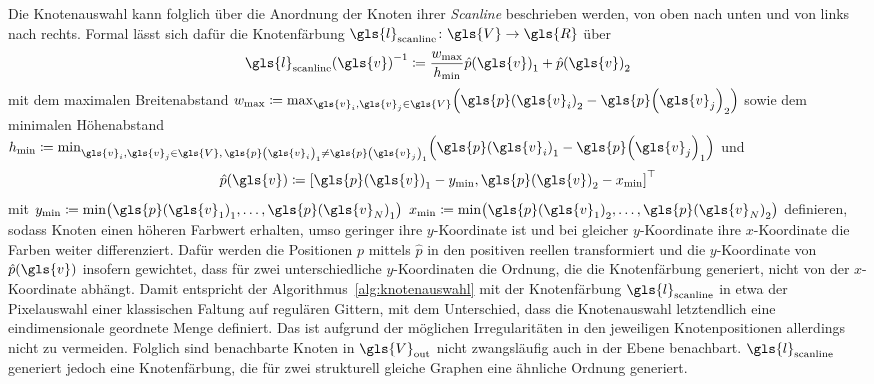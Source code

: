 Die Knotenauswahl kann folglich über die Anordnung der Knoten \bzgl{} ihrer \emph{Scanline} beschrieben werden, \dhe{} von oben nach unten und von links nach rechts.
Formal lässt sich dafür die Knotenfärbung $\gls{l}_{\mathrm{scanline}} \colon \gls{V} \to \gls{R}$ über
\begin{equation*}
  {\gls{l}_{\mathrm{scanline}}\left(\gls{v}\right)}^{-1} \coloneqq \frac{w_{\max}}{h_{\min}} {\hat p\left(\gls{v}\right)}_1 + {\hat p\left(\gls{v}\right)}_2
\end{equation*}
mit dem maximalen Breitenabstand $w_{\max} \coloneqq \max_{\gls{v}_i, \gls{v}_j \in \gls{V}} \left({\gls{p}\left(\gls{v}_i\right)}_2 - {\gls{p}\left(\gls{v}_j\right)}_2 \right)$ sowie dem minimalen Höhenabstand $h_{\min} \coloneqq \min_{\gls{v}_i, \gls{v}_j \in \gls{V},\, {\gls{p}\left(\gls{v}_i\right)}_1 \neq {\gls{p}\left(\gls{v}_j\right)}_1} \left({\gls{p}\left(\gls{v}_i\right)}_1 - {\gls{p}\left(\gls{v}_j\right)}_1 \right)$ und
\begin{equation*}
  \hat p\left(\gls{v}\right) \coloneqq {\left[{\gls{p}\left(\gls{v}\right)}_1 - y_{\min}, {\gls{p}\left(\gls{v}\right)}_2 - x_{\min}\right]}^{\top}
\end{equation*}
mit $y_{\min} \coloneqq \min \left({\gls{p}\left(\gls{v}_1\right)}_1, \ldots, {\gls{p}\left(\gls{v}_N\right)}_1\right)$ \bzw{} $x_{\min} \coloneqq \min \left({\gls{p}\left(\gls{v}_1\right)}_2, \ldots, {\gls{p}\left(\gls{v}_N\right)}_2\right)$ definieren, sodass Knoten einen höheren Farbwert erhalten, umso geringer ihre $y$-Koordinate ist und bei gleicher $y$-Koordinate ihre $x$-Koordinate die Farben weiter differenziert.
Dafür werden die Positionen $p$ mittels $\hat p$ in den positiven reellen transformiert und die $y$-Koordinate von $\hat p\left(\gls{v}\right)$ insofern gewichtet, dass für zwei unterschiedliche $y$-Koordinaten die Ordnung, die die Knotenfärbung generiert, nicht von der $x$-Koordinate abhängt.
Damit entspricht der Algorithmus~\ref{alg:knotenauswahl} mit der Knotenfärbung $\gls{l}_{\mathrm{scanline}}$ in etwa der Pixelauswahl einer klassischen Faltung auf regulären Gittern, mit dem Unterschied, dass die Knotenauswahl letztendlich eine eindimensionale geordnete Menge definiert.
Das ist aufgrund der möglichen Irregularitäten in den jeweiligen Knotenpositionen allerdings nicht zu vermeiden.
Folglich sind benachbarte Knoten in $\gls{V}_{\mathrm{out}}$ nicht zwangsläufig auch in der Ebene benachbart.
$\gls{l}_{\mathrm{scanline}}$ generiert jedoch eine Knotenfärbung, die für zwei strukturell gleiche Graphen eine ähnliche Ordnung generiert.


